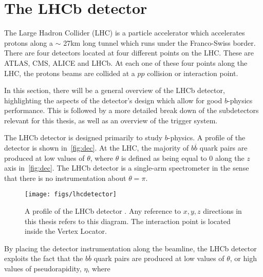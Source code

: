 \clearpage
\chapter{The LHCb detector}
\label{chap:dec}
The Large Hadron Collider (LHC) is a particle accelerator which accelerates protons along a $\sim$ 27km long tunnel which runs under the Franco-Swiss border. There are four detectors located at four different points on the \Gls{LHC}. These are \Gls{ATLAS}, \Gls{CMS}, \Gls{ALICE} and \Gls{LHCb}. At each one of these four points along the LHC, the protons beams are collided at a $pp$ collision or interaction point.


In this section, there will be a general overview of the LHCb detector, highlighting the aspects of the detector's design which allow for good $b$-physics performance. This is followed by a more detailed break down of the subdetectors relevant for this thesis, as well as an overview of the trigger system.




The \Gls{LHCb} detector is designed primarily to study $b$-physics. A profile of the detector is shown in~\autoref{fig:dec}. At the LHC, the majority of $b\overline{b}$ quark pairs are produced at low values of $\theta$, where $\theta$ is defined as being equal to $0$ along the $z$ axis in~\autoref{fig:dec}. The LHCb detector is a single-arm spectrometer in the sense that there is no instrumentation about $\theta = \pi$.




\begin{figure}[!h]
  \centering
  \texttt{[image: figs/lhcdetector]}
  \caption{A profile of the LHCb detector \cite{det_paper}. Any reference to $x, y ,z$ directions in this thesis refers to this diagram. The interaction point is located inside the Vertex Locator. %
  }
  \label{fig:dec}    
\end{figure}


By placing the detector instrumentation along the beamline, the LHCb detector exploits the fact that the $b\overline{b}$ quark pairs are produced at low values of $\theta$, or high values of pseudorapidity, $\eta$, where

